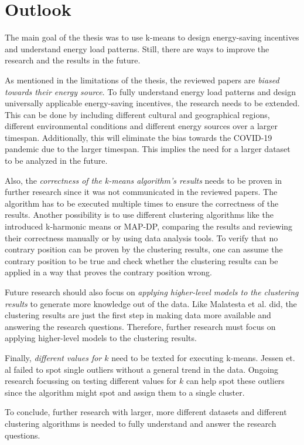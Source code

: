 
\section{Outlook}
\label{sec:outlook}
The main goal of the thesis was to use k-means to design energy-saving incentives and understand energy load patterns.
Still, there are ways to improve the research and the results in the future.

As mentioned in the limitations of the thesis, the reviewed papers are \textit{biased towards their energy source}.
To fully understand energy load patterns and design universally applicable energy-saving incentives, the research needs to be extended.
This can be done by including different cultural and geographical regions, different environmental conditions and different energy sources over a larger timespan.
Additionally, this will eliminate the bias towards the COVID-19 pandemic due to the larger timespan.
This implies the need for a larger dataset to be analyzed in the future.

Also, the \textit{correctness of the k-means algorithm's results} needs to be proven in further research since it was not communicated in the reviewed papers.
The algorithm has to be executed multiple times to ensure the correctness of the results.
Another possibility is to use different clustering algorithms like the introduced k-harmonic means or MAP-DP, comparing the results and reviewing their correctness manually or by using data analysis tools.
To verify that no contrary position can be proven by the clustering results, one can assume the contrary position to be true and check whether the clustering results can be applied in a way that proves the contrary position wrong.

Future research should also focus on \textit{applying higher-level models to the clustering results} to generate more knowledge out of the data.
Like Malatesta et al. \cite{MAL-HBP} did, the clustering results are just the first step in making data more available and answering the research questions.
Therefore, further research must focus on applying higher-level models to the clustering results.

Finally, \textit{different values for $k$} need to be texted for executing k-means.
Jessen et. al \cite{JES-IND} failed to spot single outliers without a general trend in the data.
Ongoing research focussing on testing different values for $k$ can help spot these outliers since the algorithm might spot and assign them to a single cluster.

To conclude, further research with larger, more different datasets and different clustering algorithms is needed to fully understand and answer the research questions.